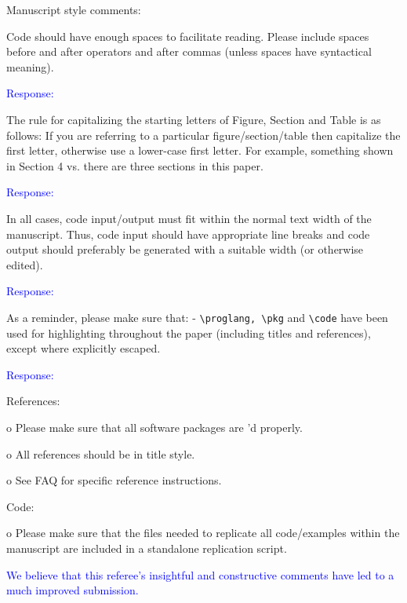\documentclass[12pt]{article}
\begin{document}
Manuscript style comments:

Code should have enough spaces to facilitate reading.  Please include
spaces before and after operators and after commas (unless spaces have
syntactical meaning).

\textcolor{blue}{Response:}

The rule for capitalizing the starting letters of Figure, Section and
Table is as follows: If you are referring to a particular
figure/section/table then capitalize the first letter, otherwise use a
lower-case first letter. For example, something shown in Section 4
vs. there are three sections in this paper.

\textcolor{blue}{Response:}

In all cases, code input/output must fit within the normal text
width of the manuscript.  Thus, code input should have appropriate
line breaks and code output should preferably be generated with a
suitable width (or otherwise edited).

\textcolor{blue}{Response:}

As a reminder, please make sure that: - \verb+\proglang, \pkg+ and
\verb+\code+ have been used for highlighting throughout the paper
(including titles and references), except where explicitly escaped.

\textcolor{blue}{Response:}

References:



o Please make sure that all software packages are \cite{}'d properly.

o All references should be in title style.

o See FAQ for specific reference instructions.


Code:

o Please make sure that the files needed to replicate all
code/examples within the manuscript are included in a standalone
replication script.


\textcolor{blue}{We believe that this referee's insightful and
  constructive comments have led to a much improved submission.}
\end{document}
